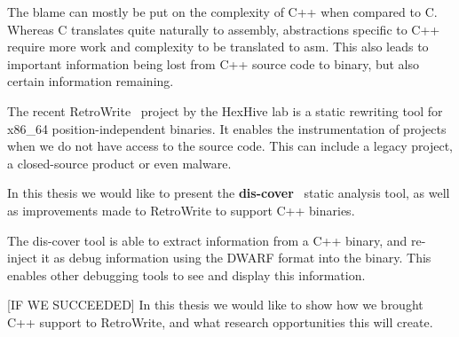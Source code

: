 \documentclass[a4paper,11pt,oneside]{report}
\begin{document}
The blame can mostly be put on the complexity of C++ when compared to C.
Whereas C translates quite naturally to assembly, abstractions specific to C++ 
require more work and complexity to be translated to asm.
This also leads to important information being lost from C++ source code to 
binary, but also certain information remaining.



The recent RetroWrite~\cite{dinesh20oakland} project by the HexHive lab is a 
static rewriting tool for x86\_64 position-independent binaries.
It enables the instrumentation of projects when we do not have access to the 
source code.
This can include a legacy project, a closed-source product or even malware.




In this thesis we would like to present the 
\textbf{dis-cover}~\cite{discovergithub} static analysis tool,
as well as improvements made to RetroWrite to support C++ binaries.



The dis-cover tool is able to extract information from a C++ binary, and 
re-inject it as debug information using the DWARF format into the binary.
This enables other debugging tools to see and display this information.







[IF WE SUCCEEDED]
In this thesis we would like to show how we brought C++ support to RetroWrite, 
and what research opportunities this will create.
\end{document}
